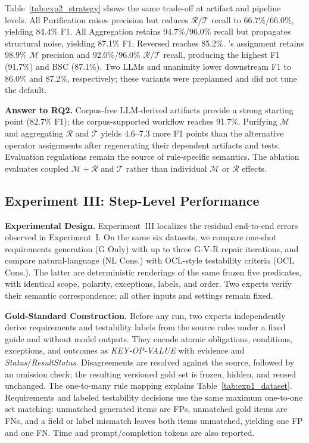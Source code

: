 Table~\ref{tab:exp2_strategy} shows the same trade-off at artifact and pipeline
levels. All Purification raises precision but reduces
$\mathcal{R}$/$\mathcal{T}$ recall to 66.7\%/66.0\%, yielding 84.4\% F1. All
Aggregation retains 94.7\%/96.0\% recall but propagates structural noise,
yielding 87.1\% F1; Reversed reaches 85.2\%. \ourtool's assignment retains
98.9\% $\mathcal{M}$ precision and 92.0\%/96.0\%
$\mathcal{R}$/$\mathcal{T}$ recall, producing the highest F1 (91.7\%) and BSC
(87.1\%). Two LLMs and unanimity lower downstream F1 to 86.0\% and 87.2\%,
respectively; these variants were preplanned and did not tune the default.

\noindent\textbf{Answer to RQ2.}
Corpus-free LLM-derived artifacts provide a strong starting point (82.7\% F1);
the corpus-supported workflow reaches 91.7\%. Purifying $\mathcal{M}$ and
aggregating $\mathcal{R}$ and $\mathcal{T}$ yields 4.6--7.3 more F1 points than
the alternative operator assignments after regenerating their dependent
artifacts and tests. Evaluation regulations remain the source of rule-specific semantics.
The ablation evaluates coupled $\mathcal{M}{+}\mathcal{R}$ and $\mathcal{T}$
rather than individual $\mathcal{M}$ or $\mathcal{R}$ effects.





\subsection{Experiment III: Step-Level Performance}
\label{sec:exp3}

\noindent
\textbf{Experimental Design.}
Experiment~III localizes the residual end-to-end errors observed in
Experiment~I. On the same six datasets, we compare one-shot requirements
generation (G Only) with up to three G-V-R repair iterations, and compare
natural-language (NL Cons.) with OCL-style testability criteria (OCL Cons.).
The latter are deterministic renderings of the same frozen five predicates,
with identical scope, polarity, exceptions, labels, and order. Two experts
verify their semantic correspondence; all other inputs and settings remain
fixed.

\noindent\textbf{Gold-Standard Construction.}
Before any run, two experts independently derive requirements and testability
labels from the source rules under a fixed guide and without model outputs.
They encode atomic obligations, conditions, exceptions, and outcomes as
\textit{KEY-OP-VALUE} with evidence and
\textit{Status}/\textit{ResultStatus}. Disagreements are resolved against the
source, followed by an omission check; the resulting versioned gold set is
frozen, hidden, and reused unchanged. The one-to-many rule mapping explains
Table~\ref{tab:exp1_dataset}. Requirements and labeled testability decisions
use the same maximum one-to-one set matching: unmatched generated items are
FPs, unmatched gold items are FNs, and a field or label mismatch leaves both
items unmatched, yielding one FP and one FN. Time and prompt/completion tokens
are also reported.

